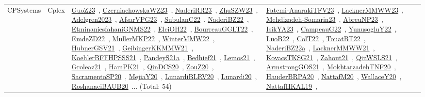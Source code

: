 {\begin{longtable}{lp{3cm}>{\raggedright\arraybackslash}p{6cm}>{\raggedright\arraybackslash}p{6cm}>{\raggedright\arraybackslash}p{8cm}}
CPSystems & Cplex & \href{works/GuoZ23.pdf}{GuoZ23}~\cite{GuoZ23}, \href{works/CzerniachowskaWZ23.pdf}{CzerniachowskaWZ23}~\cite{CzerniachowskaWZ23}, \href{works/NaderiRR23.pdf}{NaderiRR23}~\cite{NaderiRR23}, \href{works/ZhuSZW23.pdf}{ZhuSZW23}~\cite{ZhuSZW23}, \href{works/Adelgren2023.pdf}{Adelgren2023}~\cite{Adelgren2023}, \href{works/AfsarVPG23.pdf}{AfsarVPG23}~\cite{AfsarVPG23}, \href{works/SubulanC22.pdf}{SubulanC22}~\cite{SubulanC22}, \href{works/NaderiBZ22.pdf}{NaderiBZ22}~\cite{NaderiBZ22}, \href{works/EtminaniesfahaniGNMS22.pdf}{EtminaniesfahaniGNMS22}~\cite{EtminaniesfahaniGNMS22}, \href{works/ElciOH22.pdf}{ElciOH22}~\cite{ElciOH22}, \href{works/BourreauGGLT22.pdf}{BourreauGGLT22}~\cite{BourreauGGLT22}, \href{works/EmdeZD22.pdf}{EmdeZD22}~\cite{EmdeZD22}, \href{works/MullerMKP22.pdf}{MullerMKP22}~\cite{MullerMKP22}, \href{works/WinterMMW22.pdf}{WinterMMW22}~\cite{WinterMMW22}, \href{works/HubnerGSV21.pdf}{HubnerGSV21}~\cite{HubnerGSV21}, \href{works/GeibingerKKMMW21.pdf}{GeibingerKKMMW21}~\cite{GeibingerKKMMW21}, \href{works/KoehlerBFFHPSSS21.pdf}{KoehlerBFFHPSSS21}~\cite{KoehlerBFFHPSSS21}, \href{works/PandeyS21a.pdf}{PandeyS21a}~\cite{PandeyS21a}, \href{works/Bedhief21.pdf}{Bedhief21}~\cite{Bedhief21}, \href{works/Lemos21.pdf}{Lemos21}~\cite{Lemos21}, \href{works/Groleaz21.pdf}{Groleaz21}~\cite{Groleaz21}, \href{works/HamPK21.pdf}{HamPK21}~\cite{HamPK21}, \href{works/QinDCS20.pdf}{QinDCS20}~\cite{QinDCS20}, \href{works/ZouZ20.pdf}{ZouZ20}~\cite{ZouZ20}, \href{works/SacramentoSP20.pdf}{SacramentoSP20}~\cite{SacramentoSP20}, \href{works/MejiaY20.pdf}{MejiaY20}~\cite{MejiaY20}, \href{works/LunardiBLRV20.pdf}{LunardiBLRV20}~\cite{LunardiBLRV20}, \href{works/Lunardi20.pdf}{Lunardi20}~\cite{Lunardi20}, \href{works/RoshanaeiBAUB20.pdf}{RoshanaeiBAUB20}~\cite{RoshanaeiBAUB20}... (Total: 54) & \href{works/Fatemi-AnarakiTFV23.pdf}{Fatemi-AnarakiTFV23}~\cite{Fatemi-AnarakiTFV23}, \href{works/LacknerMMWW23.pdf}{LacknerMMWW23}~\cite{LacknerMMWW23}, \href{works/Mehdizadeh-Somarin23.pdf}{Mehdizadeh-Somarin23}~\cite{Mehdizadeh-Somarin23}, \href{works/AbreuNP23.pdf}{AbreuNP23}~\cite{AbreuNP23}, \href{works/IsikYA23.pdf}{IsikYA23}~\cite{IsikYA23}, \href{works/CampeauG22.pdf}{CampeauG22}~\cite{CampeauG22}, \href{works/YunusogluY22.pdf}{YunusogluY22}~\cite{YunusogluY22}, \href{works/LuoB22.pdf}{LuoB22}~\cite{LuoB22}, \href{works/ColT22.pdf}{ColT22}~\cite{ColT22}, \href{works/TouatBT22.pdf}{TouatBT22}~\cite{TouatBT22}, \href{works/NaderiBZ22a.pdf}{NaderiBZ22a}~\cite{NaderiBZ22a}, \href{works/LacknerMMWW21.pdf}{LacknerMMWW21}~\cite{LacknerMMWW21}, \href{works/KovacsTKSG21.pdf}{KovacsTKSG21}~\cite{KovacsTKSG21}, \href{works/Zahout21.pdf}{Zahout21}~\cite{Zahout21}, \href{works/QinWSLS21.pdf}{QinWSLS21}~\cite{QinWSLS21}, \href{works/ArmstrongGOS21.pdf}{ArmstrongGOS21}~\cite{ArmstrongGOS21}, \href{works/MokhtarzadehTNF20.pdf}{MokhtarzadehTNF20}~\cite{MokhtarzadehTNF20}, \href{works/HauderBRPA20.pdf}{HauderBRPA20}~\cite{HauderBRPA20}, \href{works/NattafM20.pdf}{NattafM20}~\cite{NattafM20}, \href{works/WallaceY20.pdf}{WallaceY20}~\cite{WallaceY20}, \href{works/NattafHKAL19.pdf}{NattafHKAL19}~\cite{NattafHKAL19}, 
\end{longtable}}

